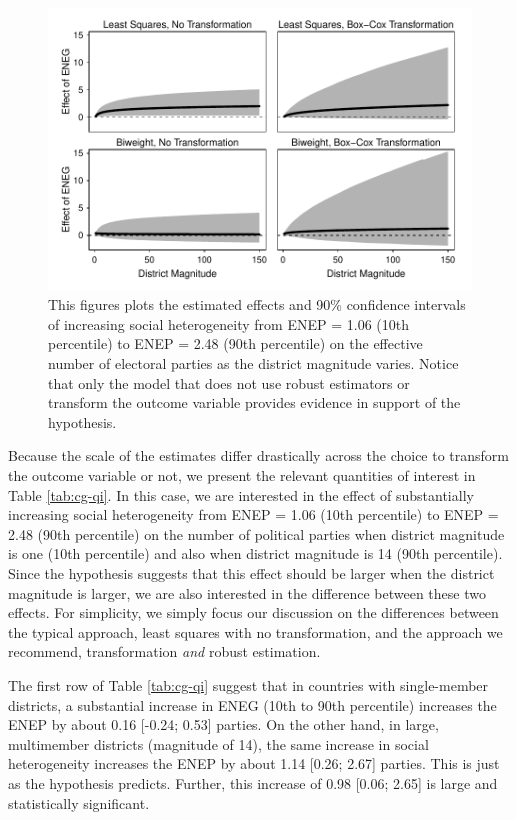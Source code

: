 \documentclass[12pt]{article}
\begin{document}
\begin{figure}[h!]
\begin{center}
\includegraphics[scale = 0.8]{figs/cg-fd-plots.pdf}
\caption{This figures plots the estimated effects and 90\% confidence intervals of increasing social heterogeneity from ENEP = 1.06 (10th percentile) to ENEP = 2.48 (90th percentile) on the effective number of electoral parties as the district magnitude varies. Notice that only the model that does not use robust estimators or transform the outcome variable provides evidence in support of the hypothesis.}\label{fig:cg-fd-plots}
\end{center}
\end{figure}

Because the scale of the estimates differ drastically across the choice to transform the outcome variable or not, we present the relevant quantities of interest in Table \ref{tab:cg-qi}. In this case, we are interested in the effect of substantially increasing social heterogeneity from ENEP = 1.06 (10th percentile) to ENEP = 2.48 (90th percentile) on the number of political parties when district magnitude is one (10th percentile) and also when district magnitude is 14 (90th percentile). Since the hypothesis suggests that this effect should be larger when the district magnitude is larger, we are also interested in the difference between these two effects. For simplicity, we simply focus our discussion on the differences between the typical approach, least squares with no transformation, and the approach we recommend, transformation \textit{and} robust estimation.

The first row of Table \ref{tab:cg-qi} suggest that in countries with single-member districts, a substantial increase in ENEG (10th to 90th percentile) increases the ENEP by about 0.16 [-0.24; 0.53] parties. On the other hand, in large, multimember districts (magnitude of 14), the same increase in social heterogeneity increases the ENEP by about 1.14 [0.26; 2.67] parties. This is just as the hypothesis predicts. Further, this increase of 0.98 [0.06; 2.65] is large and statistically significant.
\end{document}
